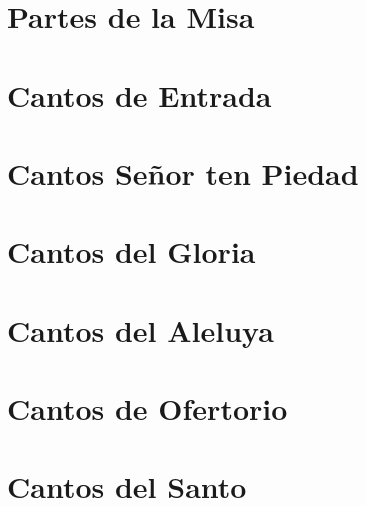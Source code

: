 \documentclass[12pt,letterpaper,twoside]{article}
\begin{document}


\section*{Partes de la Misa}
\pagebreak

\hypertarget{entrada}{}

\section{Cantos de Entrada}
\pagebreak
\pagebreak
\pagebreak
\pagebreak
\pagebreak
\pagebreak
\pagebreak
\pagebreak
\pagebreak
\pagebreak
\pagebreak
\pagebreak

\hypertarget{piedad}{}
\section{Cantos Señor ten Piedad}
\pagebreak

\hypertarget{gloria}{}
\section{Cantos del Gloria}
\pagebreak

\hypertarget{aleluya}{}
\section{Cantos del Aleluya}
\pagebreak

\pagebreak

\hypertarget{ofertorio}{}
\section{Cantos de Ofertorio}
\pagebreak
\pagebreak
\pagebreak

\hypertarget{santo}{}
\section{Cantos del Santo}
\pagebreak
\pagebreak
\end{document}
